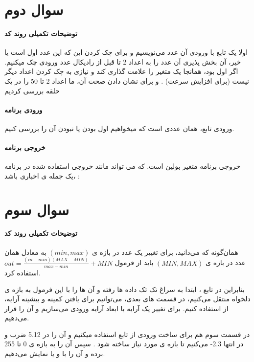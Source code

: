 \documentclass[12pt]{article}
\begin{document}
  \section{سوال دوم}
  \paragraph{توضیحات تکمیلی روند کد}
  اولا یک تابع با ورودی آن عدد می‌نویسیم و برای چک کردن این که این عدد اول است یا خیر، آن بخش پذیری آن عدد را به اعداد 2 تا قبل از رادیکال عدد ورودی چک میکنیم. اگر اول بود، همانجا یک متغیر را علامت گذاری کند و نیازی به چک کردن اعداد دیگر نیست (برای افزایش سرعت) . و برای نشان دادن صحت آن، ما اعداد 2 تا 50 را در یک حلقه بررسی کردیم 
  \paragraph{ورودی برنامه}
  ورودی تابع، همان عددی است که میخواهیم اول بودن یا نبودن آن را بررسی کنیم. 
  \paragraph{خروجی برنامه}
خروجی برنامه متغیر بولین 
است. که می تواند مانند خروجی استفاده شده در برنامه ،یک جمله ی اخباری باشد :
	\begin{flushleft}
	\end{flushleft}
 	\newpage
	\section{سوال سوم}
	\paragraph{توضیحات تکمیلی روند کد}
	
	همان‌گونه که می‌دانید، برای تغییر یک عدد در بازه ی 
	$(min,max)$
	به معادل همان عدد در بازه ی 
	$(MIN,MAX)$
	باید از فرمول 
	$ out = \frac{(in - min)(MAX-MIN)}{max-min}+MIN$
	استفاده کرد.
	
	بنابراین در تابع ، ابتدا به سراغ تک تک داده ها رفته و آن ها را	با این فرمول به بازه ی دلخواه منتقل می‌کنیم، در قسمت های بعدی، می‌توانیم برای یافتن کمینه و بیشینه آرایه، از 
	استفاده کنیم. 
	برای تغییر 
	یک آرایه با ابعاد آرایه ورودی می‌سازیم و 
	 آن را 
	 قرار می‌دهیم. 
	 
	 در قسمت سوم هم برای ساخت ورودی از تابع 
	 استفاده میکنیم  و آن را در 5.12 ضرب و در انتها 2.3- می‌کنیم تا بازه ی مورد نیاز ساخته شود .
	 سپس آن را به بازه ی 0 تا 255 برده و آن را با 
	  و یا 
	  نمایش می‌دهیم.
	   
\end{document}
